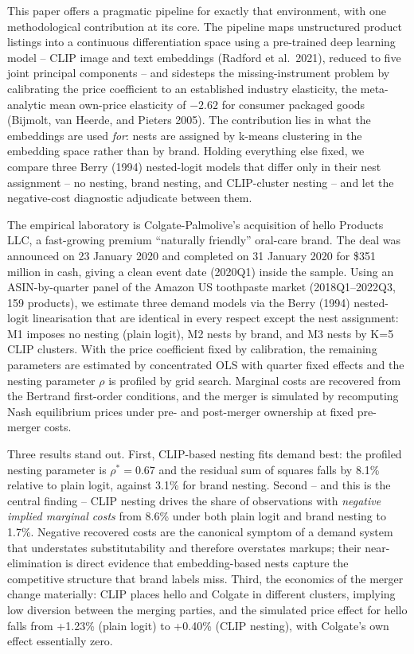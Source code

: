 This paper offers a pragmatic pipeline for exactly that environment,
with one methodological contribution at its core. The pipeline maps
unstructured product listings into a continuous differentiation space
using a pre-trained deep learning model -- CLIP image and text
embeddings (Radford et al.~2021), reduced to five joint principal
components -- and sidesteps the missing-instrument problem by
calibrating the price coefficient to an established industry elasticity,
the meta-analytic mean own-price elasticity of \(-2.62\) for consumer
packaged goods (Bijmolt, van Heerde, and Pieters 2005). The contribution
lies in what the embeddings are used \emph{for}: nests are assigned by
k-means clustering in the embedding space rather than by brand. Holding
everything else fixed, we compare three Berry (1994) nested-logit models
that differ only in their nest assignment -- no nesting, brand nesting,
and CLIP-cluster nesting -- and let the negative-cost diagnostic
adjudicate between them.

The empirical laboratory is Colgate-Palmolive's acquisition of hello
Products LLC, a fast-growing premium ``naturally friendly'' oral-care
brand. The deal was announced on 23 January 2020 and completed on 31
January 2020 for \$351 million in cash, giving a clean event date
(2020Q1) inside the sample. Using an ASIN-by-quarter panel of the Amazon
US toothpaste market (2018Q1--2022Q3, 159 products), we estimate three
demand models via the Berry (1994) nested-logit linearisation that are
identical in every respect except the nest assignment: M1 imposes no
nesting (plain logit), M2 nests by brand, and M3 nests by K=5 CLIP
clusters. With the price coefficient fixed by calibration, the remaining
parameters are estimated by concentrated OLS with quarter fixed effects
and the nesting parameter \(\rho\) is profiled by grid search. Marginal
costs are recovered from the Bertrand first-order conditions, and the
merger is simulated by recomputing Nash equilibrium prices under pre-
and post-merger ownership at fixed pre-merger costs.

Three results stand out. First, CLIP-based nesting fits demand best: the
profiled nesting parameter is \(\rho^{*}=0.67\) and the residual sum of
squares falls by 8.1\% relative to plain logit, against 3.1\% for brand
nesting. Second -- and this is the central finding -- CLIP nesting
drives the share of observations with \emph{negative implied marginal
costs} from 8.6\% under both plain logit and brand nesting to 1.7\%.
Negative recovered costs are the canonical symptom of a demand system
that understates substitutability and therefore overstates markups;
their near-elimination is direct evidence that embedding-based nests
capture the competitive structure that brand labels miss. Third, the
economics of the merger change materially: CLIP places hello and Colgate
in different clusters, implying low diversion between the merging
parties, and the simulated price effect for hello falls from +1.23\%
(plain logit) to +0.40\% (CLIP nesting), with Colgate's own effect
essentially zero.

